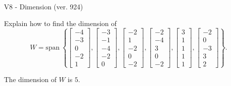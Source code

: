 \begin{exercise}
  \begin{exerciseTitle}V8 - Dimension (ver. 924)\end{exerciseTitle}
  \begin{exerciseStatement}
    Explain how to find the dimension of 
\[W=\mathrm{span}\ \left\{\left[\begin{array}{r}
-4 \\
-3 \\
0 \\
-2 \\
1
\end{array}\right] , \left[\begin{array}{r}
-3 \\
-1 \\
-4 \\
-2 \\
0
\end{array}\right] , \left[\begin{array}{r}
-2 \\
1 \\
-2 \\
0 \\
-2
\end{array}\right] , \left[\begin{array}{r}
-2 \\
-4 \\
3 \\
0 \\
-2
\end{array}\right] , \left[\begin{array}{r}
3 \\
1 \\
1 \\
1 \\
1
\end{array}\right] , \left[\begin{array}{r}
-2 \\
0 \\
-3 \\
3 \\
2
\end{array}\right]\right\}.\]



  \end{exerciseStatement}
  \begin{exerciseAnswer}
   The dimension of \(W\) is  \(5\).
  


  \end{exerciseAnswer}
\end{exercise}